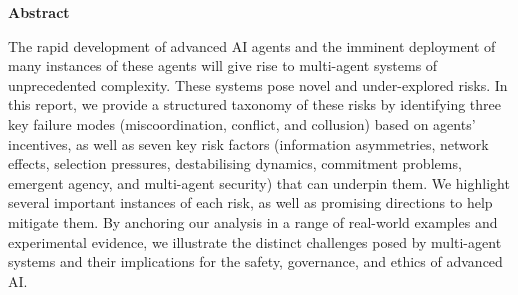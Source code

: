 \documentclass[a4paper]{article}
\begin{document}
\renewcommand{\thefootnote}{\arabic{footnote}}
\setcounter{footnote}{0}



\vspace{1.5em}

\begin{center}
    {\large \textbf{Abstract}}
    \vspace{1em}

    \begin{minipage}[]{0.75\linewidth}
        The rapid development of advanced AI agents and the imminent deployment of many instances of these agents will give rise to multi-agent systems of unprecedented complexity.
        These systems pose novel and under-explored risks.
        In this report, we provide a structured taxonomy of these risks by identifying three key failure modes (miscoordination, conflict, and collusion) based on agents' incentives, as well as seven key risk factors (information asymmetries, network effects, selection pressures, destabilising dynamics, commitment problems, emergent agency, and multi-agent security) that can underpin them.
        We highlight several important instances of each risk, as well as promising directions to help mitigate them.
        By anchoring our analysis in a range of real-world examples and experimental evidence, we illustrate the distinct challenges posed by multi-agent systems and their implications for the safety, governance, and ethics of advanced AI.
    \end{minipage}
\end{center}
\end{document}
